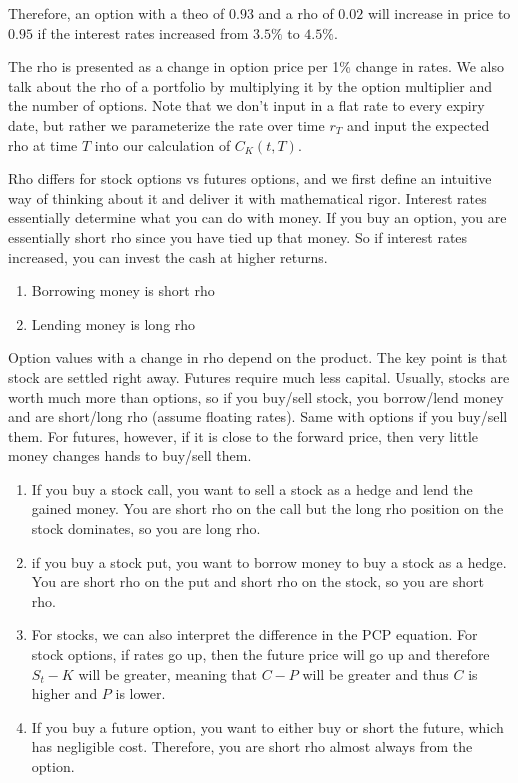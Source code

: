 \documentclass{article}
\begin{document}
    Therefore, an option with a theo of $0.93$ and a rho of $0.02$ will increase in price to $0.95$ if the interest rates increased from $3.5\%$ to $4.5\%$.  

    The rho is presented as a change in option price per 1\% change in rates. We also talk about the rho of a portfolio by multiplying it by the option multiplier and the number of options. Note that we don't input in a flat rate to every expiry date, but rather we parameterize the rate over time $r_T$ and input the expected rho at time $T$ into our calculation of $C_K (t, T)$.

    Rho differs for stock options vs futures options, and we first define an intuitive way of thinking about it and deliver it with mathematical rigor. Interest rates essentially determine what you can do with money. If you buy an option, you are essentially short rho since you have tied up that money. So if interest rates increased, you can invest the cash at higher returns.
    \begin{enumerate}
      \item Borrowing money is short rho
      \item Lending money is long rho
    \end{enumerate}

    Option values with a change in rho depend on the product. The key point is that stock are settled right away. Futures require much less capital. Usually, stocks are worth much more than options, so if you buy/sell stock, you borrow/lend money and are short/long rho (assume floating rates). Same with options if you buy/sell them. For futures, however, if it is close to the forward price, then very little money changes hands to buy/sell them.

    \begin{enumerate}
      \item If you buy a stock call, you want to sell a stock as a hedge and lend the gained money. You are short rho on the call but the long rho position on the stock dominates, so you are long rho.
      \item if you buy a stock put, you want to borrow money to buy a stock as a hedge. You are short rho on the put and short rho on the stock, so you are short rho.
      \item For stocks, we can also interpret the difference in the PCP equation. For stock options, if rates go up, then the future price will go up and therefore $S_t - K$ will be greater, meaning that $C - P$ will be greater and thus $C$ is higher and $P$ is lower.
      \item If you buy a future option, you want to either buy or short the future, which has negligible cost. Therefore, you are short rho almost always from the option.
    \end{enumerate}
\end{document}
